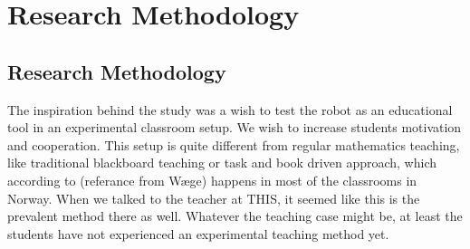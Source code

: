 \part{Research Methodology}\label{part:method}
\chapter{Research Methodology}
The inspiration behind the study was a wish to test the robot as an educational tool in an experimental classroom setup. We wish to increase students motivation and cooperation. This setup is quite different from regular mathematics teaching, like traditional blackboard teaching or task and book driven approach, which according to (referance from Wæge) happens in most of the classrooms in Norway. When we talked to the teacher at THIS, it seemed like this is the prevalent method there as well. Whatever the teaching case might be, at least the students have not experienced an experimental teaching method yet.





